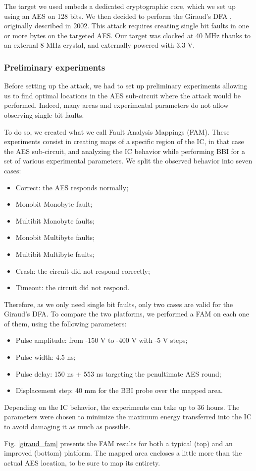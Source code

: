 		The target we used embeds a dedicated cryptographic core, which we set up using an AES on 128 bits.
		We then decided to perform the Giraud's DFA \cite{giraudDfa}, originally described in 2002.
		This attack requires creating single bit faults in one or more bytes on the targeted AES.
		Our target was clocked at 40 MHz thanks to an external 8 MHz crystal, and externally powered with 3.3 V.

		\subsubsection{Preliminary experiments}
			Before setting up the attack, we had to set up preliminary experiments allowing us to find optimal locations in the AES sub-circuit where the attack would be performed.
			Indeed, many areas and experimental parameters do not allow observing single-bit faults.
			
			To do so, we created what we call Fault Analysis Mappings (FAM).
			These experiments consist in creating maps of a specific region of the IC, in that case the AES sub-circuit, and analyzing the IC behavior while performing BBI for a set of various experimental parameters.
			We split the observed behavior into seven cases:
			\begin{itemize}
				\item Correct: the AES responds normally;
				\item Monobit Monobyte fault;
				\item Multibit Monobyte faults;
				\item Monobit Multibyte faults;
				\item Multibit Multibyte faults;
				\item Crash: the circuit did not respond correctly;
				\item Timeout: the circuit did not respond.
			\end{itemize}
			Therefore, as we only need single bit faults, only two cases are valid for the Giraud's DFA.
			To compare the two platforms, we performed a FAM on each one of them, using the following parameters:
			\begin{itemize}
				\item Pulse amplitude: from -150 V to -400 V with -5 V steps;
				\item Pulse width: 4.5 ns;
				\item Pulse delay: 150 ns + 553 ns targeting the penultimate AES round;
				\item Displacement step: 40 mm for the BBI probe over the mapped area.
			\end{itemize}
			Depending on the IC behavior, the experiments can take up to 36 hours.
			The parameters were chosen to minimize the maximum energy transferred into the IC to avoid damaging it as much as possible.
			
			Fig. \ref{giraud_fam} presents the FAM results for both a typical (top) and an improved (bottom) platform.
			The mapped area encloses a little more than the actual AES location, to be sure to map its entirety.

